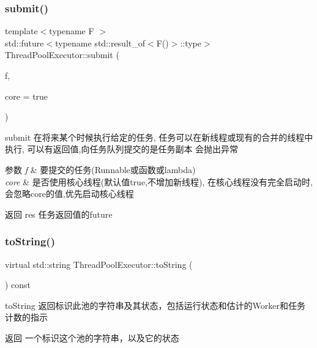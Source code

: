 \subsubsection{\texorpdfstring{submit()}{submit()}}
{\footnotesize\ttfamily template$<$typename F $>$ \\
std\+::future$<$typename std\+::result\+\_\+of$<$F()$>$\+::type$>$ Thread\+Pool\+Executor\+::submit (\begin{DoxyParamCaption}\item[{F}]{f,  }\item[{bool}]{core = {\ttfamily true} }\end{DoxyParamCaption})\hspace{0.3cm}{\ttfamily [inline]}}



submit 在将来某个时候执行给定的任务, 任务可以在新线程或现有的合并的线程中执行, 可以有返回值,向任务队列提交的是任务副本 会抛出异常 


\begin{DoxyParams}{参数}
{\em f} & 要提交的任务(Runnable或函数或lambda) \\
\hline
{\em core} & 是否使用核心线程(默认值true,不增加新线程), 在核心线程没有完全启动时,会忽略core的值,优先启动核心线程\\
\hline
\end{DoxyParams}
\begin{DoxyReturn}{返回}
res 任务返回值的future 
\end{DoxyReturn}
\mbox{\label{classThreadPoolExecutor_a8e340cec3bb976f7773db103d73189c2}} 
\subsubsection{\texorpdfstring{to\+String()}{toString()}}
{\footnotesize\ttfamily virtual std\+::string Thread\+Pool\+Executor\+::to\+String (\begin{DoxyParamCaption}{ }\end{DoxyParamCaption}) const\hspace{0.3cm}{\ttfamily [virtual]}}



to\+String 返回标识此池的字符串及其状态，包括运行状态和估计的\+Worker和任务计数的指示 

\begin{DoxyReturn}{返回}
一个标识这个池的字符串，以及它的状态 
\end{DoxyReturn}


